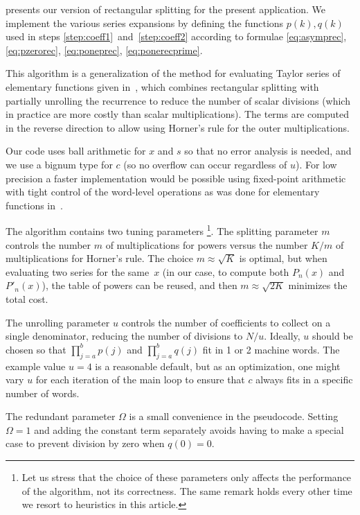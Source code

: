 \documentclass[nohypdvips,review]{siamart0216}
\begin{document}
 presents our version of rectangular splitting
for the present application.
We implement the various series expansions by defining
the functions $p(k), q(k)$ used in steps
\ref{step:coeff1}~and~\ref{step:coeff2} according to formulae
\cref{eq:asymprec}, \cref{eq:pzerorec},
\cref{eq:poneprec}, \cref{eq:ponerecprime}.

This algorithm is a generalization of the
method for evaluating Taylor series of elementary
functions given in~\cite{Johansson2015elementary},
which combines rectangular splitting
with partially unrolling the recurrence to reduce the number of scalar divisions
(which in practice are more costly than scalar multiplications).
The terms are computed in the reverse direction to allow
using Horner's rule for the outer
multiplications.

Our code uses ball arithmetic for $x$ and $s$
so that no error analysis is needed, and we use a bignum type for $c$ (so
no overflow can occur regardless of $u$).
For low precision a faster implementation
would be possible using fixed-point arithmetic with tight
control of the word-level operations
as was done for elementary functions in~\cite{Johansson2015elementary}.

The algorithm contains two tuning parameters%
\footnote{Let us stress that the choice of these parameters only affects
the performance of the algorithm, not its correctness.
The same remark holds every other time we resort to heuristics in this
article.}.
The splitting parameter $m$ controls the
number $m$ of multiplications for powers versus the number $K / m$ of
multiplications for Horner's rule.
The choice $m \approx \sqrt K$ is optimal,
but when evaluating two series for the same~$x$
(in our case, to compute both $P_n(x)$ and $P'_n(x)$),
the table of powers can be reused,
and then $m \approx \sqrt{2K}$ minimizes the total cost.

The unrolling parameter $u$ controls the number of coefficients
to collect on a single denominator, reducing the
number of divisions to $N / u$.
Ideally, $u$ should be chosen
so that $\prod_{j=a}^b p(j)$
and $\prod_{j=a}^b q(j)$ fit in 1 or 2 machine words.
The example value $u = 4$ is a reasonable
default, but as an optimization, one might vary $u$
for each iteration of the main loop
to ensure that $c$ always fits in a specific number of words.

The redundant parameter $\Omega$ is a small convenience in the pseudocode.
Setting $\Omega = 1$ and adding the constant term separately
avoids having to make a special case to prevent division by zero
when $q(0) = 0$.
\end{document}

